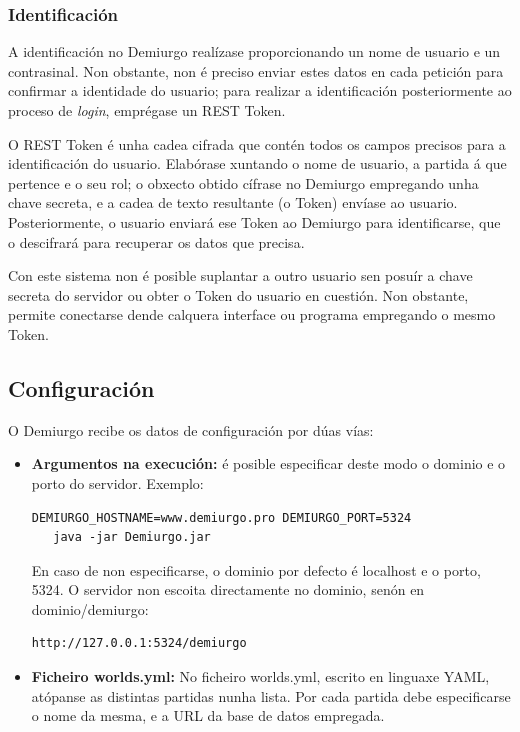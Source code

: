 \subsubsection{Identificación}
A identificación no Demiurgo realízase proporcionando un nome de usuario e un
contrasinal. Non obstante, non é preciso enviar estes datos en cada petición
para confirmar a identidade do usuario; para realizar a identificación
posteriormente ao proceso de \textit{login}, emprégase un REST Token.
\par
O REST Token é unha cadea cifrada que contén todos os campos precisos para a
identificación do usuario. Elabórase xuntando o nome de usuario, a partida á que
pertence e o seu rol; o obxecto obtido cífrase no Demiurgo empregando unha chave
secreta, e a cadea de texto resultante (o Token) envíase ao usuario.
Posteriormente, o usuario enviará ese Token ao Demiurgo para identificarse, que
o descifrará para recuperar os datos que precisa.
\par
Con este sistema non é posible suplantar a outro usuario sen posuír a chave
secreta do servidor ou obter o Token do usuario en cuestión. Non obstante,
permite conectarse dende calquera interface ou programa empregando o mesmo
Token.

\subsection{Configuración}
O Demiurgo recibe os datos de configuración por dúas vías:
\begin{itemize}
  \item \textbf{Argumentos na execución:} é posible especificar deste modo o
  dominio e o porto do servidor. Exemplo:
  \begin{lstlisting}
DEMIURGO_HOSTNAME=www.demiurgo.pro DEMIURGO_PORT=5324 
   java -jar Demiurgo.jar
  \end{lstlisting}
  En caso de non especificarse, o dominio por defecto é localhost e o porto,
  5324. O servidor non escoita directamente no dominio, senón en
  dominio/demiurgo:
  \begin{lstlisting}
http://127.0.0.1:5324/demiurgo
  \end{lstlisting}
  \item \textbf{Ficheiro worlds.yml:} No ficheiro worlds.yml, escrito en
  linguaxe YAML, atópanse as distintas partidas nunha lista. Por cada partida
  debe especificarse o nome da mesma, e a URL da base de datos empregada.
\end{itemize}

